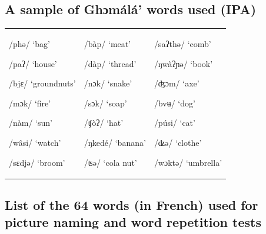 \documentclass[output=paper,newtxmath,modfonts,nonflat,draftmode]{langsci/langscibook}
\begin{document}
\subsection*{A sample of Ghɔmálá’ words used (IPA)}

\begin{tabularx}{\textwidth}{XXX}
/phə/ ‘bag’

/paʔ/ ‘house’

/bjɛ/ ‘groundnuts’

/mɔk/ ‘fire’

/nàm/ ‘sun’

/wâsi/ ‘watch’

/sɛdjə/ ‘broom’ & /bàp/ ‘meat’

/dàp/ ‘thread’

/nɔk/ ‘snake’

/sɔk/ ‘soap’

/ʧòʔ/ ‘hat’

/ŋkedé/ ‘banana’

/ʦə/ ‘cola nut’ & /saʔthə/   ‘comb’

/ŋwàʔɲə/ ‘book’

/ʤɔm/ ‘axe’

/bvʉ/ ‘dog’

/púsi/ ‘cat’

/ʣə/ ‘clothe’

/wɔktə/ ‘umbrella’\\
\end{tabularx}
\clearpage

\subsection*{List of the 64 words (in French) used for picture naming and word repetition tests }
\end{document}
